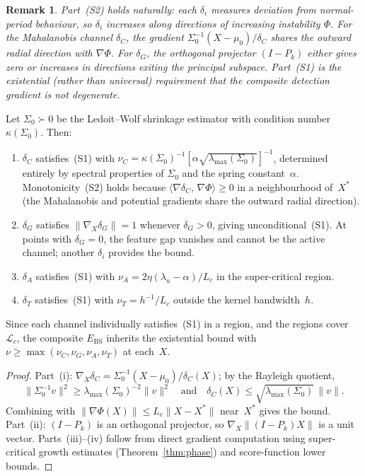 \documentclass[final]{siamltex}
\newcommand{\norm}[1]{\lVert #1 \rVert}
\newcommand{\inner}[2]{\langle #1,\, #2 \rangle}
\providecommand{\grad}{\nabla}
\newcommand{\Ebs}{E_{\mathrm{BS}}}
\newcommand{\Xst}{X^*}
\newcommand{\lmax}{\lambda_{\max}}
\newtheorem{remark}[theorem]{Remark}
\begin{document}
\begin{remark}\label{rem:monotonicity}
Part~(S2) holds naturally: each $\delta_i$ measures deviation from
normal-period behaviour, so $\delta_i$ increases along directions
of increasing instability $\Phi$.  For the Mahalanobis channel
$\delta_C$, the gradient $\Sigma_0^{-1}(X{-}\mu_0)/\delta_C$
shares the outward radial direction with $\grad\Phi$.  For
$\delta_G$, the orthogonal projector $(I{-}P_k)$ either gives zero
or increases in directions exiting the principal subspace.
Part~(S1) is the existential (rather than universal) requirement
that the \emph{composite} detection gradient is not degenerate.
\end{remark}

\begin{proposition}\label{prop:separation}
Let $\Sigma_0\succ 0$ be the Ledoit--Wolf shrinkage estimator
with condition number $\kappa(\Sigma_0)$. Then:
\begin{enumerate}
\item[\textup{(i)}] $\delta_C$ satisfies~(S1) with $\nu_C=
  \kappa(\Sigma_0)^{-1}[\alpha\sqrt{\lmax(\Sigma_0)}]^{-1}$,
  determined entirely by spectral properties of $\Sigma_0$ and the
  spring constant~$\alpha$. Monotonicity~(S2) holds because
  $\inner{\grad\delta_C}{\grad\Phi}\ge 0$ in a neighbourhood
  of~$\Xst$ (the Mahalanobis and potential gradients share the
  outward radial direction).

\item[\textup{(ii)}] $\delta_G$ satisfies $\norm{\grad_X\delta_G}=1$
  whenever $\delta_G>0$, giving unconditional~(S1). At points
  with $\delta_G=0$, the feature gap vanishes and cannot be the
  active channel; another $\delta_i$ provides the bound.

\item[\textup{(iii)}] $\delta_A$ satisfies~(S1)
  with $\nu_A=2\eta(\lambda_u-\alpha)/L_c$ in the super-critical
  region.

\item[\textup{(iv)}] $\delta_T$ satisfies~(S1)
  with $\nu_T=h^{-1}/L_c$ outside the kernel bandwidth~$h$.
\end{enumerate}
Since each channel individually satisfies~(S1) in a region,
and the regions cover $\mathcal{L}_c$, the composite $\Ebs$
inherits the existential bound with
$\nu\ge\max(\nu_C,\nu_G,\nu_A,\nu_T)$ at each~$X$.
\end{proposition}

\begin{proof}
Part~(i):
$\grad_X\delta_C=\Sigma_0^{-1}(X{-}\mu_0)/\delta_C(X)$;
by the Rayleigh quotient,
\[
  \norm{\Sigma_0^{-1}v}^2
  \ge \lmax(\Sigma_0)^{-2}\norm{v}^2
  \quad\text{and}\quad
  \delta_C(X)\le\sqrt{\lmax(\Sigma_0)}\,\norm{v}.
\]
Combining with
$\norm{\grad\Phi(X)}\le L_c\norm{X{-}\Xst}$ near~$\Xst$
gives the bound.
Part~(ii): $(I{-}P_k)$ is an orthogonal projector, so
$\grad_X\norm{(I{-}P_k)X}$ is a unit vector.
Parts~(iii)--(iv) follow from direct gradient computation
using super-critical growth estimates
(Theorem~\ref{thm:phase}) and score-function lower bounds.
\end{proof}
\end{document}

